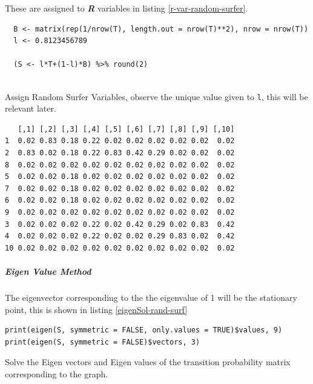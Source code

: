 \documentclass[11pt]{article}
\begin{document}
These are
assigned to \emph{\textbf{R}} variables in listing \ref{r-var-random-surfer}.

\begin{listing}[htbp]
\begin{verbatim}
  B <- matrix(rep(1/nrow(T), length.out = nrow(T)**2), nrow = nrow(T))
  l <- 0.8123456789

  (S <- l*T+(1-l)*B) %>% round(2)


\end{verbatim}
\caption{\label{r-var-random-surfer}Assign Random Surfer Variables, observe the unique value given to \texttt{l}, this will be relevant later.}
\end{listing}

\begin{verbatim}
   [,1] [,2] [,3] [,4] [,5] [,6] [,7] [,8] [,9] [,10]
1  0.02 0.83 0.18 0.22 0.02 0.02 0.02 0.02 0.02  0.02
2  0.83 0.02 0.18 0.22 0.83 0.42 0.29 0.02 0.02  0.02
8  0.02 0.02 0.02 0.02 0.02 0.02 0.02 0.02 0.02  0.02
5  0.02 0.02 0.18 0.02 0.02 0.02 0.02 0.02 0.02  0.02
7  0.02 0.02 0.18 0.02 0.02 0.02 0.02 0.02 0.02  0.02
6  0.02 0.02 0.18 0.02 0.02 0.02 0.02 0.02 0.02  0.02
9  0.02 0.02 0.02 0.02 0.02 0.02 0.02 0.02 0.02  0.02
3  0.02 0.02 0.02 0.22 0.02 0.42 0.29 0.02 0.83  0.42
4  0.02 0.02 0.02 0.22 0.02 0.02 0.29 0.83 0.02  0.42
10 0.02 0.02 0.02 0.02 0.02 0.02 0.02 0.02 0.02  0.02
\end{verbatim}
\subparagraph{Eigen Value Method}
\label{eigen-value-method}
The eigenvector corresponding to the the eigenvalue of 1 will be the
stationary point, this is shown in listing \ref{eigenSol-rand-surf}

\begin{listing}[htbp]
\begin{verbatim}
print(eigen(S, symmetric = FALSE, only.values = TRUE)$values, 9)
print(eigen(S, symmetric = FALSE)$vectors, 3)
\end{verbatim}
\caption{\label{eigenSol-rand-surf}Solve the Eigen vectors and Eigen values of the transition probability matrix corresponding to the graph.}
\end{listing}
\end{document}
